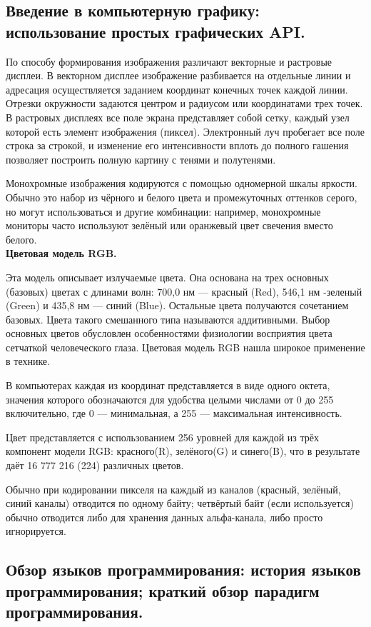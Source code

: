 \documentclass[12pt, a4paper]{article}
\begin{document}
\subsection{Введение в компьютерную графику: использование простых графических API.}

По способу формирования изображения различают векторные и растровые дисплеи. В векторном дисплее изображение разбивается на отдельные линии и адресация осуществляется заданием координат конечных точек каждой линии. Отрезки окружности задаются центром и радиусом или координатами трех точек. В растровых дисплеях все поле экрана представляет собой сетку, каждый узел которой есть элемент изображения (пиксел). Электронный луч пробегает все поле строка за строкой, и изменение его интенсивности вплоть до полного гашения позволяет построить полную картину с тенями и полутенями. 

Монохромные изображения кодируются с помощью одномерной шкалы яркости. Обычно это набор из чёрного и белого цвета и промежуточных оттенков серого, но могут использоваться и другие комбинации: например, монохромные мониторы часто используют зелёный или оранжевый цвет свечения вместо белого.\\

\textbf{Цветовая модель RGB.}

Эта модель описывает излучаемые цвета. Она основана на трех основных (базовых) цветах с длинами волн: 700,0 нм — красный (Red), 546,1 нм -зеленый (Green) и 435,8 нм — синий (Blue). Остальные цвета получаются сочетанием базовых. Цвета такого смешанного типа называются аддитивными. Выбор основных цветов обусловлен особенностями физиологии восприятия цвета сетчаткой человеческого глаза. Цветовая модель RGB нашла широкое применение в технике.

В компьютерах каждая из координат представляется в виде одного октета, значения которого обозначаются для удобства целыми числами от 0 до 255 включительно, где 0 — минимальная, а 255 — максимальная интенсивность. 

Цвет представляется с использованием 256 уровней для каждой из трёх компонент модели RGB: красного(R), зелёного(G) и синего(B), что в результате даёт 16 777 216 (224) различных цветов.

Обычно при кодировании пикселя на каждый из каналов (красный, зелёный, синий каналы) отводится по одному байту; четвёртый байт (если используется) обычно отводится либо для хранения данных альфа-канала, либо просто игнорируется.

\subsection{Обзор языков программирования: история языков программирования; краткий обзор парадигм программирования.}
\end{document}
